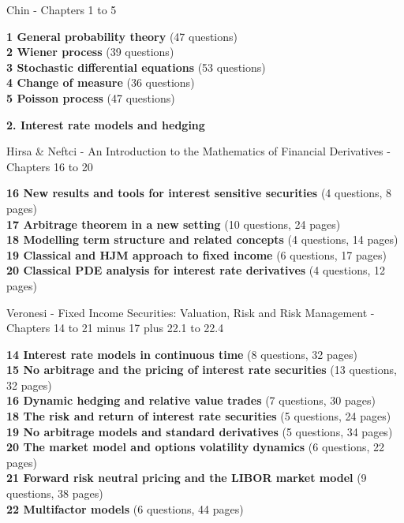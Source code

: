 \documentclass[hidelinks, 12pt]{article}
\theoremstyle{mydefstyle}
\theoremstyle{mythmstyle}
\begin{document}
Chin - Chapters 1 to 5

\textbf{1 General probability theory} (47 questions) \\
\textbf{2 Wiener process} (39 questions) \\
\textbf{3 Stochastic differential equations} (53 questions) \\
\textbf{4 Change of measure} (36 questions) \\
\textbf{5 Poisson process} (47 questions)

\newpage

\begin{center}
\textbf{2. Interest rate models and hedging}
\end{center}

Hirsa \& Neftci - An Introduction to the Mathematics of Financial Derivatives  - Chapters 16 to 20

\textbf{16 New results and tools for interest sensitive securities} (4 questions, 8 pages) \\
\textbf{17 Arbitrage theorem in a new setting} (10 questions, 24 pages) \\
\textbf{18 Modelling term structure and related concepts} (4 questions, 14 pages) \\
\textbf{19 Classical and HJM approach to fixed income} (6 questions, 17 pages) \\
\textbf{20 Classical PDE analysis for interest rate derivatives} (4 questions, 12 pages)

Veronesi - Fixed Income Securities: Valuation, Risk and Risk Management - Chapters 14 to 21 minus 17 plus 22.1 to 22.4

\textbf{14 Interest rate models in continuous time} (8 questions, 32 pages) \\
\textbf{15 No arbitrage and the pricing of interest rate securities} (13 questions, 32 pages) \\
\textbf{16 Dynamic hedging and relative value trades} (7 questions, 30 pages) \\
\textbf{18 The risk and return of interest rate securities} (5 questions, 24 pages) \\
\textbf{19 No arbitrage models and standard derivatives} (5 questions, 34 pages) \\
\textbf{20 The market model and options volatility dynamics} (6 questions, 22 pages) \\
\textbf{21 Forward risk neutral pricing and the LIBOR market model} (9 questions, 38 pages) \\
\textbf{22 Multifactor models} (6 questions, 44 pages) 
\end{document}
